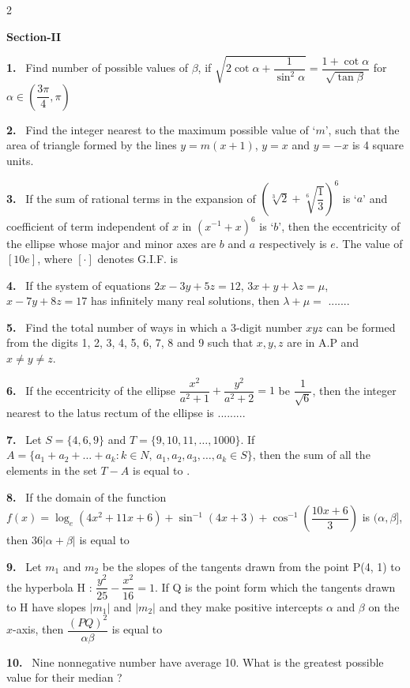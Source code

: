\documentclass[10pt]{extarticle}
\newcommand{\sect}[1]{\par\smallskip\noindent\textbf{#1}\par}
\newcommand{\qn}[1]{\par\smallskip\noindent\textbf{#1.}~}
\begin{document}
\begin{multicols}{2}
\sect{Section-II}

\qn{1} Find number of possible values of $\beta$, if $\sqrt{2\cot\alpha+\dfrac1{\sin^2\alpha}}=\dfrac{1+\cot\alpha}{\sqrt{\tan\beta}}$ for $\alpha\in\left(\dfrac{3\pi}4,\pi\right)$

\qn{2} Find the integer nearest to the maximum possible value of `$m$', such that the area of triangle formed by the lines $y=m(x+1)$, $y=x$ and $y=-x$ is 4 square units.

\qn{3} If the sum of rational terms in the expansion of $\left(\sqrt[3]2+\sqrt[6]{\dfrac13}\right)^6$ is `$a$' and coefficient of term independent of $x$ in $(x^{-1}+x)^6$ is `$b$', then the eccentricity of the ellipse whose major and minor axes are $b$ and $a$ respectively is $e$. The value of $[10e]$, where $[\cdot]$ denotes G.I.F. is

\qn{4} If the system of equations $2x-3y+5z=12$, $3x+y+\lambda z=\mu$, $x-7y+8z=17$ has infinitely many real solutions, then $\lambda+\mu=$ .......

\qn{5} Find the total number of ways in which a 3-digit number $xyz$ can be formed from the digits 1, 2, 3, 4, 5, 6, 7, 8 and 9 such that $x,y,z$ are in A.P and $x\neq y\neq z$.

\qn{6} If the eccentricity of the ellipse $\dfrac{x^2}{a^2+1}+\dfrac{y^2}{a^2+2}=1$ be $\dfrac1{\sqrt6}$, then the integer nearest to the latus rectum of the ellipse is .........

\qn{7} Let $S=\{4,6,9\}$ and $T=\{9,10,11,\dots,1000\}$. If $A=\{a_1+a_2+\dots+a_k:k\in N,\ a_1,a_2,a_3,\dots,a_k\in S\}$, then the sum of all the elements in the set $T-A$ is equal to \underline{\hspace{3em}}.

\qn{8} If the domain of the function $f(x)=\log_e(4x^2+11x+6)+\sin^{-1}(4x+3)+\cos^{-1}\left(\dfrac{10x+6}3\right)$ is $(\alpha,\beta]$, then $36|\alpha+\beta|$ is equal to

\qn{9} Let $m_1$ and $m_2$ be the slopes of the tangents drawn from the point P(4, 1) to the hyperbola H : $\dfrac{y^2}{25}-\dfrac{x^2}{16}=1$. If Q is the point form which the tangents drawn to H have slopes $|m_1|$ and $|m_2|$ and they make positive intercepts $\alpha$ and $\beta$ on the $x$-axis, then $\dfrac{(PQ)^2}{\alpha\beta}$ is equal to

\qn{10} Nine nonnegative number have average 10. What is the greatest possible value for their median ?

\end{multicols}
\end{document}
